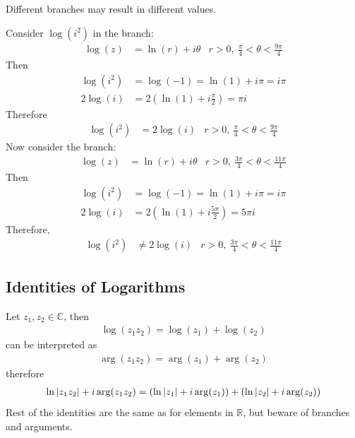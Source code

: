 \documentclass[12pt, english]{book}
\begin{document}
	Different branches may result in different values.
	\begin{example}
		Consider \(\log(i^2)\) in the branch: 
		\begin{align*}
			\log(z) &= \ln(r) + i\theta & r>0, \ \frac{\pi}{4}<\theta<\frac{9\pi}{4}
		\end{align*}
		Then
		\begin{align*}
			\log(i^2) &= \log(-1) = \ln(1) + i\pi = i\pi \\
			2\log(i) &= 2\left(\ln(1) + i\frac{\pi}{2}\right) = \pi i
		\end{align*}
		Therefore
		\begin{align*}
			\log(i^2) &= 2\log(i) & r>0, \ \frac{\pi}{4}<\theta<\frac{9\pi}{4}
		\end{align*}
		Now consider the branch:
		\begin{align*}
			\log(z) &= \ln(r) + i\theta & r>0, \ \frac{3\pi}{4}<\theta<\frac{11\pi}{4}
		\end{align*}
		{\color{Grey}
		Then 
		\begin{align*}
			\log(i^2) &= \log(-1) = \ln(1) + i\pi = i\pi\\
			2\log(i) &= 2\left(\ln(1) + i\frac{5\pi}{2}\right) = 5\pi i
		\end{align*}
		Therefore,
		\begin{align*}
			\log(i^2) &\neq 2\log(i) & r>0, \ \frac{3\pi}{4}<\theta<\frac{11\pi}{4}
		\end{align*}
		}
	\end{example}

	\subsection{Identities of Logarithms} \label{Identities of Logarithms Subsection - Complex} 
	
	Let \(z_1, z_2 \in \mathbb{C}\), then 
	\begin{align*}
		\log(z_1 z_2) = \log(z_1) + \log(z_2)
	\end{align*}
	can be interpreted as 
	\begin{align*}
		\arg(z_1 z_2) = \arg(z_1) + \arg(z_2)
	\end{align*}
	therefore
	\begin{align*}
		\ln\abs{z_1 z_2} + i\arg(z_1 z_2) = (\ln\abs{z_1} + i\arg(z_1)) + (\ln\abs{z_2} + i\arg(z_2))
	\end{align*}
	Rest of the identities are the same as for elements in \(\mathbb{R}\), but beware of branches and arguments.
	
\end{document}
